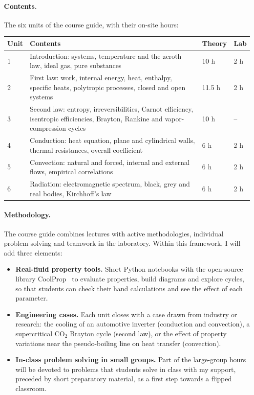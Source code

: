 \documentclass[11pt]{article}
\begin{document}
\paragraph{Contents.} The six units of the course guide, with their on-site hours:
\begin{center}\small
\begin{tabularx}{\textwidth}{@{}p{0.6cm}Xp{1.3cm}p{1.2cm}@{}}
\toprule
\textbf{Unit} & \textbf{Contents} & \textbf{Theory} & \textbf{Lab} \\
\midrule
1 & Introduction: systems, temperature and the zeroth law, ideal gas, pure substances & 10 h & 2 h \\
2 & First law: work, internal energy, heat, enthalpy, specific heats, polytropic processes, closed and open systems & 11.5 h & 2 h \\
3 & Second law: entropy, irreversibilities, Carnot efficiency, isentropic efficiencies, Brayton, Rankine and vapor-compression cycles & 10 h & -- \\
4 & Conduction: heat equation, plane and cylindrical walls, thermal resistances, overall coefficient & 6 h & 2 h \\
5 & Convection: natural and forced, internal and external flows, empirical correlations & 6 h & 2 h \\
6 & Radiation: electromagnetic spectrum, black, grey and real bodies, Kirchhoff's law & 6 h & 2 h \\
\bottomrule
\end{tabularx}
\end{center}

\paragraph{Methodology.} The course guide combines lectures with active methodologies,
individual problem solving and teamwork in the laboratory. Within this framework, I will
add three elements:
\begin{itemize}
  \item \textbf{Real-fluid property tools.} Short Python notebooks with the open-source
  library CoolProp~\cite{CoolProp2014} to evaluate properties, build diagrams and explore
  cycles, so that students can check their hand calculations and see the effect of each
  parameter.
  \item \textbf{Engineering cases.} Each unit closes with a case drawn from industry or
  research: the cooling of an automotive inverter (conduction and convection), a
  supercritical CO$_2$ Brayton cycle (second law), or the effect of property variations
  near the pseudo-boiling line on heat transfer (convection).
  \item \textbf{In-class problem solving in small groups.} Part of the large-group hours
  will be devoted to problems that students solve in class with my support, preceded by
  short preparatory material, as a first step towards a flipped classroom.
\end{itemize}
\end{document}
